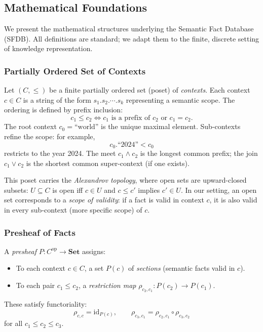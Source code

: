 \subsection{Mathematical Foundations}
\label{sec:math}

We present the mathematical structures underlying the Semantic Fact Database (SFDB).
All definitions are standard; we adapt them to the finite, discrete setting of
knowledge representation.

\subsubsection{Partially Ordered Set of Contexts}
\label{sec:poset}

Let \((C, \leq)\) be a finite partially ordered set (poset) of \emph{contexts}.
Each context \(c \in C\) is a string of the form \(s_1.s_2.\cdots.s_k\) representing
a semantic scope.  The ordering is defined by prefix inclusion:
\[
c_1 \leq c_2 \iff \text{\(c_1\) is a prefix of \(c_2\) or \(c_1 = c_2\)}.
\]
The root context \(c_0 = \text{``world''}\) is the unique maximal element.
Sub-contexts refine the scope: for example,
\[
c_0.\text{``2024''} < c_0
\]
restricts to the year 2024.  The meet \(c_1 \land c_2\) is the longest
common prefix; the join \(c_1 \lor c_2\) is the shortest common super-context
(if one exists).

This poset carries the \emph{Alexandrov topology},
where open sets are upward-closed subsets: \(U \subseteq C\) is open iff
\(c \in U\) and \(c \leq c'\) implies \(c' \in U\).  In our setting, an open set
corresponds to a \emph{scope of validity}: if a fact is valid in context \(c\),
it is also valid in every sub-context (more specific scope) of \(c\).

\subsubsection{Presheaf of Facts}
\label{sec:presheaf}

\begin{definition}[Presheaf]
\label{def:presheaf}
A \emph{presheaf} \(P: C^{\mathrm{op}} \to \mathbf{Set}\) assigns:
\begin{itemize}
    \item To each context \(c \in C\), a set \(P(c)\) of \emph{sections}
          (semantic facts valid in \(c\)).
    \item To each pair \(c_1 \leq c_2\), a \emph{restriction map}
          \(\rho_{c_2,c_1}: P(c_2) \to P(c_1)\).
\end{itemize}
These satisfy functoriality:
\[
\rho_{c,c} = \mathrm{id}_{P(c)},
\qquad
\rho_{c_3,c_1} = \rho_{c_2,c_1} \circ \rho_{c_3,c_2}
\]
for all \(c_1 \leq c_2 \leq c_3\).
\end{definition}

